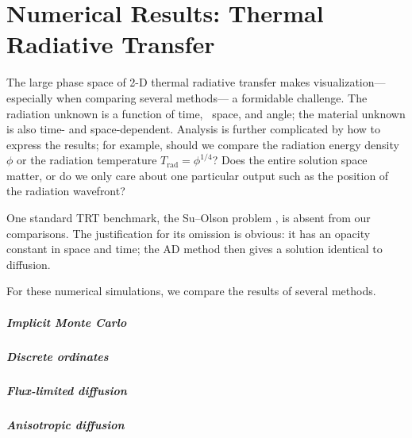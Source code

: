 
\chapter{Numerical Results: Thermal Radiative Transfer}
\label{chap:trtNumericalResults}

The large phase space of 2-D thermal radiative transfer makes visualization---%
especially when comparing several methods---%
a formidable challenge. The radiation unknown is a function of time, \xy\
space, and angle; the material unknown is also time- and space-dependent.
Analysis is further complicated by how to express the results; for example,
should we compare the radiation energy density $\phi$ or
the radiation temperature $T_\text{rad}=\phi^{1/4}$? Does the entire solution
space matter, or do we only care about one particular output such as the
position of the radiation wavefront?


One standard TRT benchmark, the Su--Olson problem \cite{Su1997}, is absent from
our comparisons. The justification for its omission is obvious: it has an
opacity constant in space and time; the AD method then gives a solution identical
to diffusion.

For these numerical simulations, we compare the results of several methods.

\paragraph{Implicit Monte Carlo}

\paragraph{Discrete ordinates}

\paragraph{Flux-limited diffusion}

\paragraph{Anisotropic diffusion}

